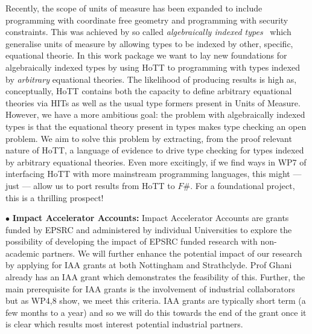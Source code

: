 \documentclass[a4paper,11pt]{article}
\begin{document}
Recently, the scope of units of measure has been expanded to include
programming with coordinate free geometry and programming with
security constraints. This was achieved by so called {\em
  algebraically indexed types}~\cite{ajk} which generalise units of
measure by allowing types to be indexed by other, specific, equational
theorie. In this work package we want to lay new foundations for
algebraically indexed types by using HoTT to programming with types
indexed by {\em arbitrary} equational theories. The likelihood of
producing results is high as, conceptually, HoTT contains both the
capacity to define arbitrary equational theories via HITs as well as
the usual type formers present in Units of Measure. However, we have a
more ambitious goal: the problem with algebraically indexed types is
that the equational theory present in types makes type checking an
open problem. We aim to solve this problem by extracting, from the proof
relevant nature of HoTT, a language of evidence to drive type checking
for types indexed by arbitrary equational theories. Even more
excitingly, if we find ways in WP7 of interfacing HoTT with more
mainstream programming languages, this might --- just --- allow us to port
results from HoTT to $F\#$.  For a foundational project, this is a
thrilling prospect!


\vspace*{0.02in}

$\bullet$ {\bf Impact Accelerator Accounts:}  Impact Accelerator
Accounts are grants funded by EPSRC and administered by individual
Universities to explore the possibility of developing the impact of
EPSRC funded research with non-academic partners. We will further
enhance the potential impact of our research by applying for IAA
grants at both Nottingham and Strathclyde. Prof Ghani already has an
IAA grant which demonstrates the feasibility of this. Further, the
main prerequisite for IAA grants is the involvement of industrial
collaborators but as WP4,8 show, we meet this criteria. IAA grants
are typically short term (a few months to a year) and so we
will do this towards the end of the grant once it is clear which
results most interest potential industrial partners.

\vspace*{0.02in}
\end{document}
